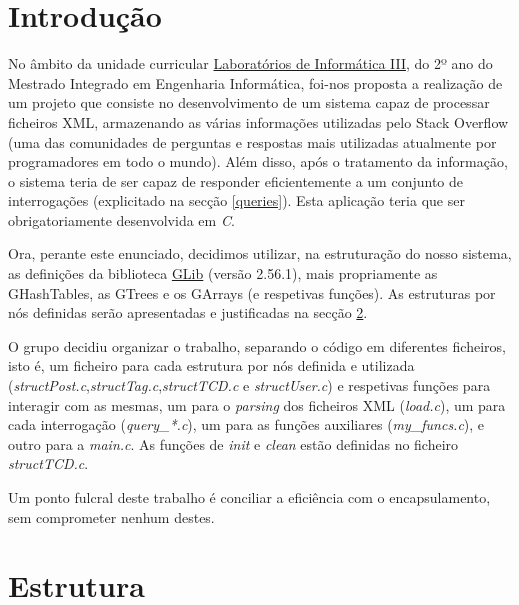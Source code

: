 \documentclass[a4paper, 11pt, oneside]{article}
\begin{document}

\tableofcontents
\lstlistoflistings

\newpage


\section{Introdução}

No âmbito da unidade curricular \underline{Laboratórios de Informática III}, do 2º ano do Mestrado Integrado em Engenharia Informática, foi-nos proposta a realização de um projeto que consiste no desenvolvimento de um sistema capaz de processar ficheiros XML, armazenando as várias informações utilizadas pelo Stack Overflow (uma das comunidades de perguntas e respostas mais utilizadas atualmente por programadores em todo o mundo). Além disso, após o tratamento da informação, o sistema teria de ser capaz de responder eficientemente a um conjunto de interrogações (explicitado na secção \ref{queries}). Esta aplicação teria que ser obrigatoriamente desenvolvida em \textit{C}.

Ora, perante este enunciado, decidimos utilizar, na estruturação do nosso sistema, as definições da biblioteca \href{https://developer.gnome.org/glib}{GLib} (versão 2.56.1), mais propriamente as GHashTables, as GTrees e os GArrays (e respetivas funções). As estruturas por nós definidas serão apresentadas e justificadas na secção \ref{structs}.

O grupo decidiu organizar o trabalho, separando o código em diferentes ficheiros, isto é, um ficheiro para cada estrutura por nós definida e utilizada (\textit{structPost.c},\textit{structTag.c},\textit{structTCD.c} e \textit{structUser.c}) e respetivas funções para interagir com as mesmas, um para o \textit{parsing} dos ficheiros XML (\textit{load.c}), um para cada interrogação (\textit{query\_*.c}), um para as funções auxiliares (\textit{my\_funcs.c}), e outro para a \textit{main.c}. As funções de \textit{init} e \textit{clean} estão definidas no ficheiro \textit{structTCD.c}.

Um ponto fulcral deste trabalho é conciliar a eficiência com o encapsulamento, sem comprometer nenhum destes.


\newpage
\section{Estrutura}
\label{structs}
\end{document}
